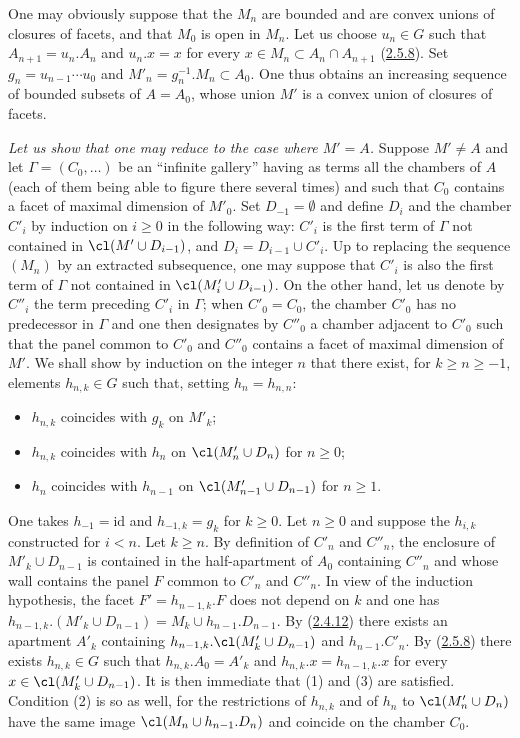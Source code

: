 \documentclass[12pt,a4paper,oneside,english]{smfart}
\makeatletter
\newcommand{\btpageanchor}[1]{\Hy@raisedlink{\hypertarget{p:#1}{}}}
\newcommand{\btref}[1]{\hyperlink{bt:#1}{#1}}
\newcommand{\btpage}[1]{\marginnote{p.~#1}\btpageanchor{#1}}
\newcommand{\pagemark}[1]{\btpage{#1}}
\theoremstyle{definition}
\theoremstyle{bt}
\makeatother
\begin{document}
\medskip
One may obviously suppose that the $M_n$ are bounded and are convex unions of
closures of facets, and that $M_0$ is open in $M_n$. Let us choose $u_n\in G$
such that $A_{n+1}=u_n.A_n$ and $u_n.x=x$ for every
$x\in M_n\subset A_n\cap A_{n+1}$ (\btref{2.5.8}). Set $g_n=u_{n-1}\cdots u_0$ and
$M'_n=g_n^{-1}.M_n\subset A_0$. One thus obtains an increasing sequence of
bounded subsets of $A=A_0$, whose union $M'$ is a convex union of closures of
facets.

\emph{Let us show that one may reduce to the case where $M'=A$.} Suppose
$M'\neq A$ and let $\Gamma=(C_0,\dots)$ be an ``infinite gallery'' having as
terms all the chambers of $A$ (each of them being able to figure there several
times) and such that $C_0$ contains a facet of maximal dimension of $M'_0$.
Set $D_{-1}=\emptyset$ and define $D_i$ and the chamber $C'_i$ by induction on
$i\ge 0$ in the following way: $C'_i$ is the first term of $\Gamma$ not
contained in $\cl(M'\cup D_{i-1})$, and $D_i=D_{i-1}\cup C'_i$. Up to
replacing the sequence $(M_n)$ by an extracted subsequence, one may suppose
that $C'_i$ is also the first term of $\Gamma$ not contained in
$\cl(M'_i\cup D_{i-1})$. On the other hand, let us denote by $C''_i$ the term
preceding $C'_i$ in $\Gamma$; when $C'_0=C_0$, the chamber $C'_0$ has no
predecessor in $\Gamma$ and one then designates by $C''_0$ a chamber adjacent
to $C'_0$ such that the panel common to $C'_0$ and $C''_0$ contains a facet of
maximal dimension of $M'$. We shall show by induction on the integer $n$ that
there exist, for $k\ge n\ge -1$, elements $h_{n,k}\in G$ such that, setting
$h_n=h_{n,n}$:
\begin{itemize}\itemsep2pt
\item[(1)] $h_{n,k}$ coincides with $g_k$ on $M'_k$;
\item[(2)] $h_{n,k}$ coincides with $h_n$ on $\cl(M'_n\cup D_n)$ for $n\ge 0$;
\item[(3)] $h_n$ coincides with $h_{n-1}$ on $\cl(M'_{n-1}\cup D_{n-1})$ for
$n\ge 1$.
\end{itemize}
One takes $h_{-1}=\mathrm{id}$ and $h_{-1,k}=g_k$ for $k\ge 0$. Let $n\ge 0$
and suppose the $h_{i,k}$ constructed for $i<n$. Let $k\ge n$. By definition
of $C'_n$ and $C''_n$, the enclosure of $M'_k\cup D_{n-1}$ is
\pagemark{54}
contained in the half-apartment of $A_0$ containing $C''_n$ and whose wall
contains the panel $F$ common to $C'_n$ and $C''_n$. In view of the induction
hypothesis, the facet $F'=h_{n-1,k}.F$ does not depend on $k$ and one has
$h_{n-1,k}.(M'_k\cup D_{n-1})=M_k\cup h_{n-1}.D_{n-1}$. By (\btref{2.4.12}) there
exists an apartment $A'_k$ containing $h_{n-1,k}.\cl(M'_k\cup D_{n-1})$ and
$h_{n-1}.C'_n$. By (\btref{2.5.8}) there exists $h_{n,k}\in G$ such that
$h_{n,k}.A_0=A'_k$ and $h_{n,k}.x=h_{n-1,k}.x$ for every
$x\in\cl(M'_k\cup D_{n-1})$. It is then immediate that (1) and (3) are
satisfied. Condition (2) is so as well, for the restrictions of $h_{n,k}$ and
of $h_n$ to $\cl(M'_n\cup D_n)$ have the same image
$\cl(M_n\cup h_{n-1}.D_n)$ and coincide on the chamber $C_0$.
\end{document}
